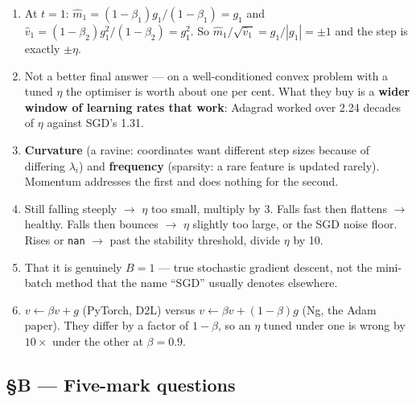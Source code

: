 \documentclass[11pt,a4paper]{article}
\newcommand{\A}[1]{\item[\textbf{#1}]}
\begin{document}
\begin{enumerate}[leftmargin=1.9cm]
\A{U3.20} At $t=1$: $\hat m_1 = (1-\beta_1)g_1/(1-\beta_1) = g_1$ and
$\hat v_1 = (1-\beta_2)g_1^2/(1-\beta_2) = g_1^2$. So
$\hat m_1/\sqrt{\hat v_1} = g_1/|g_1| = \pm 1$ and the step is exactly
$\pm\eta$.

\A{U3.21} Not a better final answer --- on a well-conditioned convex problem
with a tuned $\eta$ the optimiser is worth about one per cent. What they buy is
a \textbf{wider window of learning rates that work}: Adagrad worked over 2.24
decades of $\eta$ against SGD's 1.31.

\A{U3.22} \textbf{Curvature} (a ravine: coordinates want different step sizes
because of differing $\lambda_i$) and \textbf{frequency} (sparsity: a rare
feature is updated rarely). Momentum addresses the first and does nothing for
the second.

\A{U3.23} Still falling steeply $\to$ $\eta$ too small, multiply by 3. Falls
fast then flattens $\to$ healthy. Falls then bounces $\to$ $\eta$ slightly too
large, or the SGD noise floor. Rises or \texttt{nan} $\to$ past the stability
threshold, divide $\eta$ by 10.

\A{U3.24} That it is genuinely $B = 1$ --- true stochastic gradient descent,
not the mini-batch method that the name ``SGD'' usually denotes elsewhere.

\A{U3.25} $v \leftarrow \beta v + g$ (PyTorch, D2L) versus
$v \leftarrow \beta v + (1-\beta)g$ (Ng, the Adam paper). They differ by a
factor of $1-\beta$, so an $\eta$ tuned under one is wrong by $10\times$ under
the other at $\beta = 0.9$.
\end{enumerate}

\subsection*{§B --- Five-mark questions}
\end{document}
